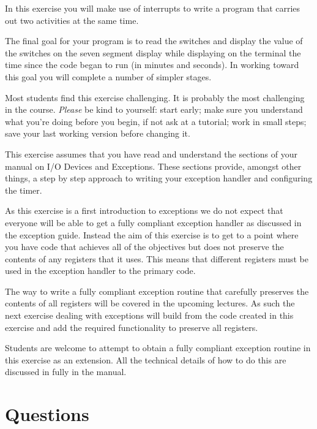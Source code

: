 \documentclass[a4paper,10pt]{article}
\begin{document}
In this exercise you will make use of interrupts to write a program
that carries out two activities at the same time.

The final goal for your program is to read the switches and display
the value of the switches on the seven segment display while
displaying on the terminal the time since the code began to run (in
minutes and seconds).  In working toward this goal you will complete
a number of simpler stages.

Most students find this exercise challenging.  It is probably the most
challenging in the course.  {\em Please} be kind to yourself: start
early; make sure you understand what you're doing before you begin, if
not ask at a tutorial; work in small steps; save your last working
version before changing it.

This exercise assumes that you have read and understand the sections
of your manual on I/O Devices and Exceptions. These sections
provide, amongst other things, a step by step approach to writing your
exception handler and configuring the timer.

As this exercise is a first introduction to exceptions we do not
expect that everyone will be able to get a fully compliant exception
handler as discussed in the exception guide. Instead the aim of this
exercise is to get to a point where you have code that achieves all of
the objectives but does not preserve the contents of any registers
that it uses. This means that different registers must be used in the
exception handler to the primary code.

The way to write a fully compliant exception routine that carefully
preserves the contents of all registers will be covered in the
upcoming lectures. As such the next exercise dealing with exceptions
will build from the code created in this exercise and add the required
functionality to preserve all registers.

Students are welcome to attempt to obtain a fully compliant exception
routine in this exercise as an extension. All the technical details of
how to do this are discussed in fully in the manual.

\section{Questions}
\end{document}
